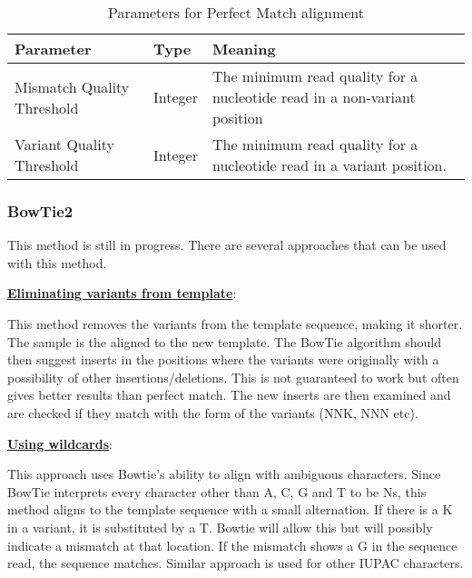 \documentclass[12pt,a4paper]{article}
\begin{document}
\vspace{0.5cm}
\begin{table}[h!]
    \centering
    \begin{tabular}{|l|l|p{8cm}|}
        \hline
        \textbf{Parameter} & \textbf{Type} & \textbf{Meaning} \\
        \hline
        Mismatch Quality Threshold & Integer & The minimum read quality for a 
        nucleotide read in a non-variant position\\
        \hline
        Variant Quality Threshold & Integer & The minimum read quality for a 
        nucleotide read in a variant position.\\
        \hline
    \end{tabular}
    \caption{Parameters for Perfect Match alignment}
    \label{perfect_match_parameters}
\end{table}

\subsubsection{BowTie2}
This method is still in progress. There are several approaches that can be used
 with this method.

\vspace{0.5cm}
\noindent
\underline{\textbf{Eliminating variants from template}}:

This method removes the variants from the template sequence, making it shorter.
 The sample is the aligned to the new template. The BowTie algorithm should 
 then suggest inserts in the positions where the variants were originally with
  a possibility of other insertions/deletions. This is not guaranteed to work 
  but often gives better results than perfect match. The new inserts are then 
  examined and are checked if they match with the form of the variants 
  (NNK, NNN etc).

\vspace{0.5cm}
\noindent
\underline{\textbf{Using wildcards}}:

This approach uses Bowtie's ability to align with ambiguous characters. Since 
BowTie interprets every character other than A, C, G and T to be Ns, this 
method aligns to the template sequence with a small alternation. If there is a 
K in a variant, it is substituted by a T. Bowtie will allow this but will 
possibly indicate a mismatch at that location. If the mismatch shows a G in the
 sequence read, the sequence matches. Similar approach is used for other IUPAC 
 characters.
\end{document}
